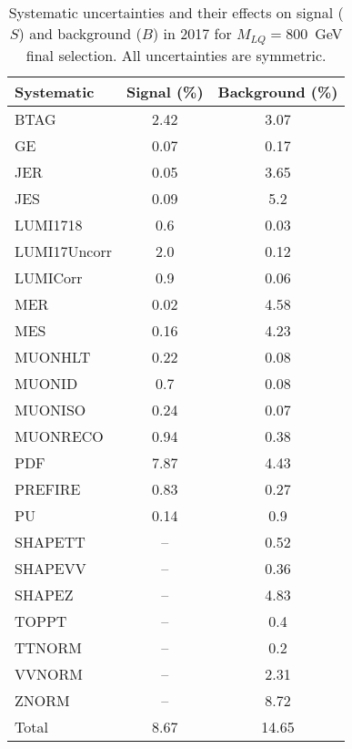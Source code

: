 \begin{table}[htbp]
\begin{center}
\caption{Systematic uncertainties and their effects on signal ($S$) and background ($B$) in 2017 for $M_{LQ}=800$~GeV final selection. All uncertainties are symmetric.}
\begin{tabular}{lcc}
\hline\hline
Systematic & Signal (\%) & Background (\%) \\ \hline 
BTAG & 2.42 & 3.07\\ 
GE & 0.07 & 0.17\\ 
JER & 0.05 & 3.65\\ 
JES & 0.09 & 5.2\\ 
LUMI1718 & 0.6 & 0.03\\ 
LUMI17Uncorr & 2.0 & 0.12\\ 
LUMICorr & 0.9 & 0.06\\ 
MER & 0.02 & 4.58\\ 
MES & 0.16 & 4.23\\ 
MUONHLT & 0.22 & 0.08\\ 
MUONID & 0.7 & 0.08\\ 
MUONISO & 0.24 & 0.07\\ 
MUONRECO & 0.94 & 0.38\\ 
PDF & 7.87 & 4.43\\ 
PREFIRE & 0.83 & 0.27\\ 
PU & 0.14 & 0.9\\ 
SHAPETT & -- & 0.52\\ 
SHAPEVV & -- & 0.36\\ 
SHAPEZ & -- & 4.83\\ 
TOPPT & -- & 0.4\\ 
TTNORM & -- & 0.2\\ 
VVNORM & -- & 2.31\\ 
ZNORM & -- & 8.72\\ 
Total & 8.67 & 14.65\\ \hline \hline
\end{tabular}
\label{tab:SysUncertainties_uujj_800}
\end{center}
\end{table}

